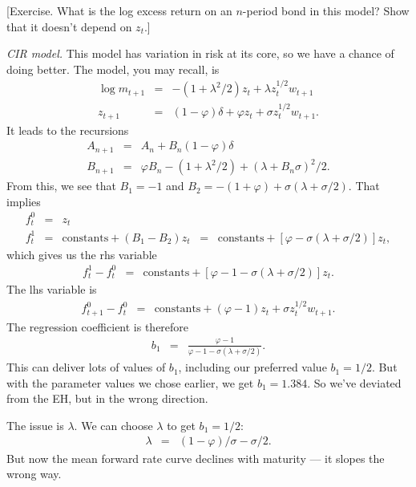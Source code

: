 \documentclass[11pt]{article}
\begin{document}
[Exercise.
What is the log excess return on an $n$-period bond in this model?
Show that it doesn't depend on $z_t$.]

{\it CIR model.\/}
This model has variation in risk at its core,
so we have a chance of doing better.
The model, you may recall,
is
\begin{eqnarray*}
    \log m_{t+1} &=& - (1+\lambda^2/2 ) z_t + \lambda z_t^{1/2} w_{t+1} \nonumber \\
         z_{t+1} &=& (1-\varphi) \delta + \varphi z_t + \sigma z_t^{1/2} w_{t+1} .
         \label{eq:square-root}
\end{eqnarray*}
It leads to the recursions
\begin{eqnarray*}
    A_{n+1} &=& A_n + B_n (1-\varphi) \delta \\
    B_{n+1} &=& \varphi B_n -(1+\lambda^2/2) + (\lambda + B_n \sigma)^2/2 .
\end{eqnarray*}
From this, we see that $B_1 = -1$ and $B_2 = -(1+\varphi) + \sigma(\lambda + \sigma/2)$.
That implies
\begin{eqnarray*}
    f^0_t &=& z_t \\
    f^1_t &=& \mbox{constants} + (B_1-B_2) z_t
            \;\;=\;\; \mbox{constants} + [\varphi-\sigma(\lambda+\sigma/2)] z_t ,
\end{eqnarray*}
which gives us the rhs variable
\begin{eqnarray*}
    f^1_t - f^0_t &=& \mbox{constants} + [\varphi-1-\sigma(\lambda+\sigma/2)] z_t .
\end{eqnarray*}
The lhs variable is
\begin{eqnarray*}
    f^0_{t+1} - f^0_t &=&  \mbox{constants} + (\varphi-1) z_t + \sigma z_t^{1/2} w_{t+1}.
\end{eqnarray*}
The regression coefficient is therefore
\begin{eqnarray*}
    b_1 &=& \frac{\varphi-1}{\varphi-1-\sigma(\lambda+\sigma/2)} .
\end{eqnarray*}
This can deliver lots of values of $b_1$, including our preferred value $b_1 = 1/2$.
But with the parameter values we chose earlier, we get $b_1 = 1.384$.
So we've deviated from the EH, but in the wrong direction.

The issue is $\lambda$.  We can choose $\lambda$ to get $b_1 = 1/2$:
\begin{eqnarray*}
    \lambda &=& (1-\varphi)/\sigma - \sigma/2 .
\end{eqnarray*}
But now the mean forward rate curve declines with maturity ---
it slopes the wrong way.
\end{document}
